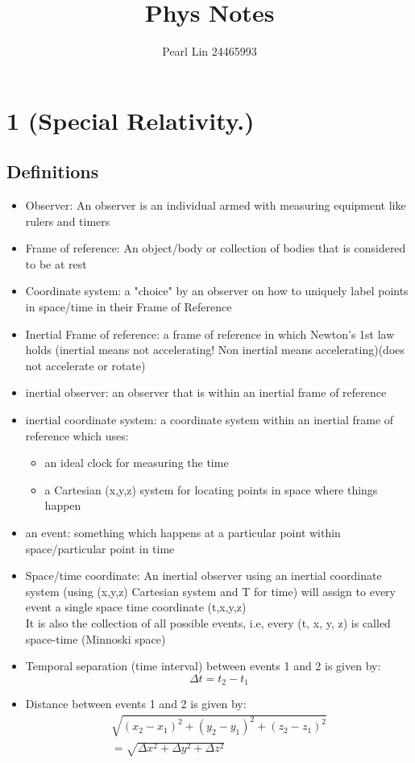 \documentclass[10pt]{report}
\author{Pearl Lin 24465993}
\title{Phys Notes}
\begin{document}
\maketitle
\chapter{1 (Special Relativity.)}
\section{Definitions}
\begin{itemize}
	\item{Observer: An observer is an individual armed with measuring equipment like rulers and timers}
	\item{Frame of reference: An object/body or collection of bodies that is considered to be at rest}
	\item{Coordinate system: a "choice" by an observer on how to uniquely label points in space/time in their Frame of Reference}
	\item{Inertial Frame of reference: a frame of reference in which Newton's 1st law holds (inertial means not accelerating! Non inertial means accelerating)(does not accelerate or rotate)}
	\item{inertial observer: an observer that is within an inertial frame of reference}
	\item{inertial coordinate system: a coordinate system within an inertial frame of reference which uses:}
		\begin{itemize}
			\item{an ideal clock for measuring the time}
			\item{a Cartesian (x,y,z) system for locating points in space where things happen}
		\end{itemize}
	\item{an event: something which happens at a particular point within space/particular point in time}
	\item{Space/time coordinate: An inertial observer using an inertial coordinate system (using (x,y,z) Cartesian system and T for time) will assign to every event a single space time coordinate (t,x,y,z)\\ It is also the collection of all possible events, i.e, every (t, x, y, z) is called space-time (Minnoski space)}
	\item{Temporal separation (time interval) between events 1 and 2 is given by: \[
	\Delta t=t_{2}-t_{1}
	\] 
	}
	\item{Distance between events 1 and 2 is given by:
\begin{align*}
	\sqrt{\left(x_{2}-x_{1}\right)^{2}+\left(y_{2}-y_{1}\right)^{2}+\left(z_{2}-z_{1}\right)^{2}} \\=\sqrt{\Delta x^{2}+\Delta y^{2}+\Delta z^{2}}
\end{align*}
	}
\end{itemize}
\end{document}
